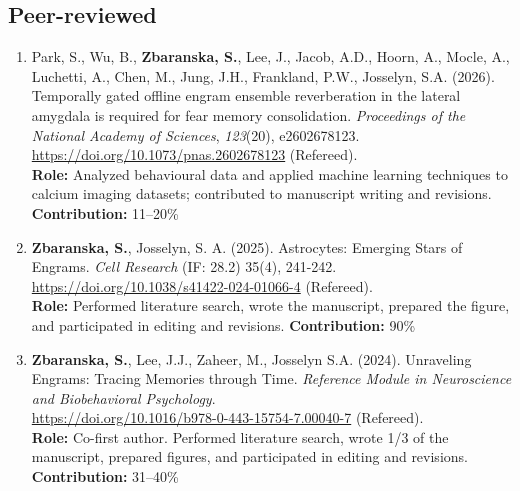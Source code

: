 \documentclass[12pt]{article}
\begin{document}
\subsection*{Peer-reviewed}
\begin{enumerate}
   \item Park, S., Wu, B., \textbf{Zbaranska, S.}, Lee, J., Jacob, A.D., Hoorn, A., Mocle, A., Luchetti, A., Chen, M., Jung, J.H., Frankland, P.W., Josselyn, S.A. (2026). Temporally gated offline engram ensemble reverberation in the lateral amygdala is required for fear memory consolidation. \textit{Proceedings of the National Academy of Sciences}, \textit{123}(20), e2602678123. \\ \href{https://doi.org/10.1073/pnas.2602678123}{https://doi.org/10.1073/pnas.2602678123} (Refereed). \\
    \textbf{Role:} Analyzed behavioural data and applied machine learning techniques to calcium imaging datasets; contributed to manuscript writing and revisions.\\
    \textbf{Contribution:} 11--20\%

    \item \textbf{Zbaranska, S.}, Josselyn, S. A. (2025). Astrocytes: Emerging Stars of Engrams. \textit{Cell Research} (IF: 28.2) 35(4), 241-242. \href{https://doi.org/10.1038/s41422-024-01066-4}{https://doi.org/10.1038/s41422-024-01066-4} (Refereed). \\
    \textbf{Role:} Performed literature search, wrote the manuscript, prepared the figure, and participated in editing and revisions.  
    \textbf{Contribution:} 90\%

    \item \textbf{Zbaranska, S.}, Lee, J.J., Zaheer, M., Josselyn S.A. (2024). Unraveling Engrams: Tracing Memories through Time. \textit{Reference Module in Neuroscience and Biobehavioral Psychology}. \\
    \href{https://doi.org/10.1016/b978-0-443-15754-7.00040-7}{https://doi.org/10.1016/b978-0-443-15754-7.00040-7} (Refereed). \\
    \textbf{Role:} Co-first author. Performed literature search, wrote 1/3 of the manuscript, prepared figures, and participated in editing and revisions.  
    \textbf{Contribution:} 31--40\%
\end{enumerate}
\end{document}
